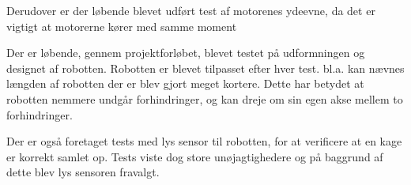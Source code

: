 Derudover er der løbende blevet udført test af motorenes ydeevne, da det er vigtigt at motorerne kører med samme moment

Der er løbende, gennem projektforløbet, blevet testet på udformningen og designet af robotten. Robotten er blevet tilpasset efter hver test. bl.a. kan nævnes længden af robotten der er blev gjort meget kortere. Dette har betydet at robotten nemmere undgår forhindringer, og kan dreje om sin egen akse mellem to forhindringer.

Der er også foretaget tests med lys sensor til robotten, for at verificere at en kage er korrekt samlet op. Tests viste dog store unøjagtighedere og på baggrund af dette blev lys sensoren fravalgt.